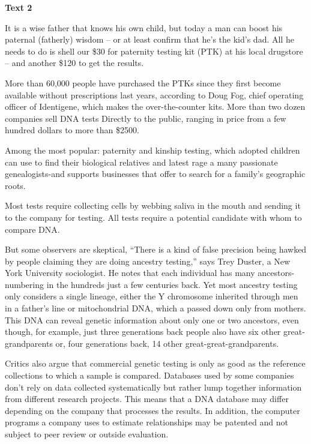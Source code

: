 \begin{center}\textbf{Text 2}\end{center}

\qquad It is a wise father that knows his own child, but today a man can boost his paternal (fatherly) wisdom – or at least confirm that he's the kid's dad. All he needs to do is shell our \$30 for paternity testing kit (PTK) at his local drugstore – and another \$120 to get the results.

\qquad More than 60,000 people have purchased the PTKs since they first become available without prescriptions last years, according to Doug Fog, chief operating officer of Identigene, which makes the over-the-counter kits. More than two dozen companies sell DNA tests Directly to the public, ranging in price from a few hundred dollars to more than \$2500.

\qquad Among the most popular: paternity and kinship testing, which adopted children can use to find their biological relatives and latest rage a many passionate genealogists-and supports businesses that offer to search for a family's geographic roots.

\qquad Most tests require collecting cells by webbing saliva in the mouth and sending it to the company for testing.  All tests require a potential candidate with whom to compare DNA.

\qquad But some observers are skeptical, “There is a kind of false precision being hawked by people claiming they are doing ancestry testing,” says Trey Duster, a New York University sociologist. He notes that each individual has many ancestors-numbering in the hundreds just a few centuries back. Yet most ancestry testing only considers a single lineage, either the Y chromosome inherited through men in a father’s line or mitochondrial DNA, which a passed down only from mothers. This DNA can reveal genetic information about only one or two ancestors, even though, for example, just three generations back people also have six other great-grandparents or, four generations back, 14 other great-great-grandparents.

\qquad Critics also argue that commercial genetic testing is only as good as the reference collections to which a sample is compared. Databases used by some companies don’t rely on data collected systematically but rather lump together information from different research projects. This means that a DNA database may differ depending on the company that processes the results. In addition, the computer programs a company uses to estimate relationships may be patented and not subject to peer review or outside evaluation.


